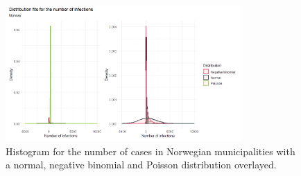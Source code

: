 %         
\begin{figure}[H]
    \centering
    \includegraphics[width = 0.8\textwidth]{distrfit_norway.png}
    \caption{Histogram for the number of cases in Norwegian municipalities with a normal, negative binomial and Poisson distribution overlayed.}
    \label{fitDistrNorway}
\end{figure}
\clearpage
